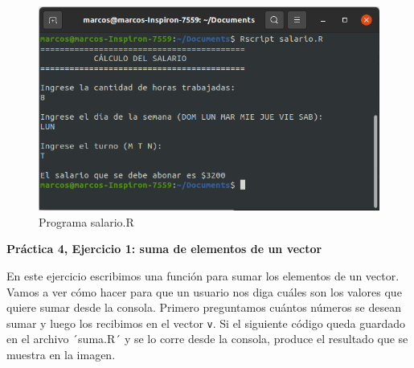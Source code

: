 \documentclass[
]{book}
\newenvironment{Shaded}{\begin{snugshade}}{\end{snugshade}}
\newcommand{\AttributeTok}[1]{\textcolor[rgb]{0.77,0.63,0.00}{#1}}
\newcommand{\ControlFlowTok}[1]{\textcolor[rgb]{0.13,0.29,0.53}{\textbf{#1}}}
\newcommand{\DecValTok}[1]{\textcolor[rgb]{0.00,0.00,0.81}{#1}}
\newcommand{\FunctionTok}[1]{\textcolor[rgb]{0.00,0.00,0.00}{#1}}
\newcommand{\NormalTok}[1]{#1}
\newcommand{\OtherTok}[1]{\textcolor[rgb]{0.56,0.35,0.01}{#1}}
\newcommand{\SpecialCharTok}[1]{\textcolor[rgb]{0.00,0.00,0.00}{#1}}
\newcommand{\StringTok}[1]{\textcolor[rgb]{0.31,0.60,0.02}{#1}}
\begin{document}
\begin{Shaded}
\end{Shaded}

\begin{figure}

{\centering \includegraphics[width=0.8\linewidth]{images/07_otros/consola3} 

}

\caption{Programa salario.R}\label{fig:unnamed-chunk-164}
\end{figure}

\textbf{Práctica 4, Ejercicio 1: suma de elementos de un vector}

En este ejercicio escribimos una función para sumar los elementos de un vector.
Vamos a ver cómo hacer para que un usuario nos diga cuáles son los valores que quiere sumar desde la consola. Primero preguntamos cuántos números se desean sumar y luego los recibimos en el vector \texttt{v}. Si el siguiente código queda guardado en el archivo ´suma.R´ y se lo corre desde la consola, produce el resultado que se muestra en la imagen.
\end{document}
